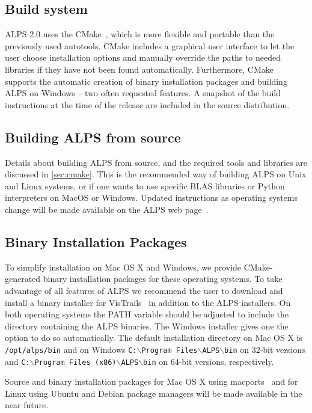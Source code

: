 \documentclass[12pt]{iopart}
\begin{document}
\subsection{Build system}
ALPS 2.0 uses the CMake~\cite{cmake}, which is more flexible and portable than the previously used autotools. CMake includes a graphical user interface to let the user choose installation options and manually override the paths to needed libraries if they have not been found automatically. Furthermore, CMake supports the automatic creation of binary installation packages and building ALPS on Windows -- two often requested features. A snapshot of the build instructions at the time of the release are included in the source distribution. 
\subsection{Building ALPS from source}

Details about building ALPS from source, and the required tools and libraries are discussed in \ref{sec:cmake}. This is the recommended way of building ALPS on Unix and Linux systems, or if one wants to use specific BLAS libraries or Python interpreters on MacOS or Windows. Updated instructions as operating systems change will be made available on the ALPS web page~\cite{alps}.

\subsection{Binary Installation Packages}

To simplify installation on Mac OS X and Windows, we provide CMake-generated binary installation packages for these operating systems. To take advantage of all features of ALPS we recommend the user to download and install a binary installer for VisTrails~\cite{vistrails} in addition to the ALPS installers. On both operating systems the PATH variable should be adjusted to include the directory containing the ALPS binaries. The Windows installer gives one the option to do so automatically. The default installation directory on Mac OS X is {\tt /opt/alps/bin} and on Windows {\tt C:$\backslash$Program Files$\backslash$ALPS$\backslash$bin} on 32-bit versions and {\tt C:$\backslash$Program Files (x86)$\backslash$ALPS$\backslash$bin} on 64-bit versions, respectively.

Source and binary installation packages for Mac OS X using macports~\cite{macports} and for Linux using Ubuntu and Debian package managers will be made available in the near future.
\end{document}
